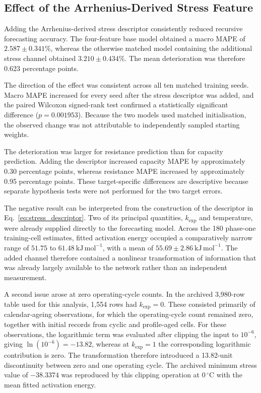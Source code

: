 \documentclass[a4paper,fleqn]{cas-sc}
\begin{document}

\subsection{Effect of the Arrhenius-Derived Stress Feature}
\label{sec:stress_results}

Adding the Arrhenius-derived stress descriptor consistently reduced recursive forecasting accuracy. The four-feature base model obtained a macro MAPE of $2.587\pm0.341$\%, whereas the otherwise matched model containing the additional stress channel obtained $3.210\pm0.434$\%. The mean deterioration was therefore 0.623 percentage points.

The direction of the effect was consistent across all ten matched training seeds. Macro MAPE increased for every seed after the stress descriptor was added, and the paired Wilcoxon signed-rank test confirmed a statistically significant difference ($p=0.001953$). Because the two models used matched initialisation, the observed change was not attributable to independently sampled starting weights.


The deterioration was larger for resistance prediction than for capacity prediction. Adding the descriptor increased capacity MAPE by approximately 0.30 percentage points, whereas resistance MAPE increased by approximately 0.95 percentage points. These target-specific differences are descriptive because separate hypothesis tests were not performed for the two target errors.

The negative result can be interpreted from the construction of the descriptor in Eq.~\eqref{eq:stress_descriptor}. Two of its principal quantities, $k_{\mathrm{exp}}$ and temperature, were already supplied directly to the forecasting model. Across the 180 phase-one training-cell estimates, fitted activation energy occupied a comparatively narrow range of \(51.75\) to \(61.48~\mathrm{kJ\,mol^{-1}}\), with a mean of \(55.69\pm2.86~\mathrm{kJ\,mol^{-1}}\). The added channel therefore contained a nonlinear transformation of information that was already largely available to the network rather than an independent measurement.

A second issue arose at zero operating-cycle counts. In the archived 3,980-row table used for this analysis, 1,554 rows had $k_{\mathrm{exp}}=0$. These consisted primarily of calendar-ageing observations, for which the operating-cycle count remained zero, together with initial records from cyclic and profile-aged cells. For these observations, the logarithmic term was evaluated after clipping the input to $10^{-6}$, giving $\ln(10^{-6})=-13.82$, whereas at $k_{\mathrm{exp}}=1$ the corresponding logarithmic contribution is zero. The transformation therefore introduced a 13.82-unit discontinuity between zero and one operating cycle. The archived minimum stress value of $-38.3374$ was reproduced by this clipping operation at $0\,^{\circ}\mathrm{C}$ with the mean fitted activation energy.
\end{document}
